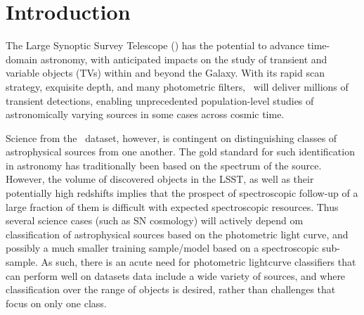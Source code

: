 \section{Introduction}
\label{sec:intro}

The Large Synoptic Survey Telescope (\lsst) has the potential to advance time-domain astronomy, with anticipated impacts on the study of transient and variable objects (TVs) within and beyond the Galaxy.
With its rapid scan strategy, exquisite depth, and many photometric filters, \lsst\ will deliver millions of transient detections, enabling unprecedented population-level studies of astronomically varying sources in some cases across cosmic time.

Science from the \lsst\ dataset, however, is contingent on distinguishing classes of astrophysical sources
 from one another. The gold standard for such identification in astronomy has traditionally been
based on the spectrum of the source. However, the volume of discovered objects in the LSST, as well as their potentially high redshifts implies that the prospect of spectroscopic follow-up of a large fraction of them is difficult
with expected spectroscopic resources. Thus several science cases (such as SN cosmology) will actively depend om classification of astrophysical sources based on the photometric light curve, and possibly a much smaller training sample/model based on a spectroscopic sub-sample. 
As such, there is an acute need for photometric lightcurve classifiers that can perform well on datasets data include a wide variety of sources, and where classification over the range of objects is desired, rather than challenges that focus on only one class.

